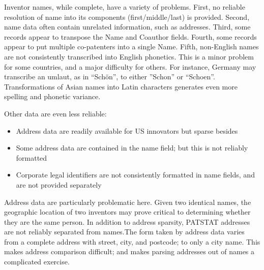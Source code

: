 \documentclass[11pt]{article}
\begin{document}
Inventor names, while complete, have a variety of problems. First, no
reliable resolution of name into its components (first/middle/last) is
provided. Second, name data often contain unrelated information, such
as addresses. Third, some records appear to transpose the Name and
Coauthor fields. Fourth, some records appear to put multiple
co-patenters into a single Name. Fifth, non-English names are not
consistently transcribed into English phonetics. This is a minor
problem for some countries, and a major difficulty for others. For
instance, Germany may transcribe an umlaut, as in
``Sch\"on'', to either ''Schon'' or  ``Schoen''. Transformations of
Asian names into Latin characters generates even more spelling and
phonetic variance.

Other data are even less reliable:
\begin{itemize}
\item Address data are readily available for US innovators but sparse besides
\item Some address data are contained in the name field; but this is
  not reliably formatted
\item Corporate legal identifiers are not consistently formatted in
  name fields, and are not provided separately
\end{itemize}

Address data are particularly problematic here. Given two identical
names, the geographic location of two inventors may prove critical to
determining whether they are the same person. In addition to address
sparsity, PATSTAT addresses are not reliably separated from names.The
form taken by address data varies from a complete address with street,
city, and postcode; to only a city name. This makes address
comparison difficult; and makes parsing addresses out of names a
complicated exercise.


\end{document}
